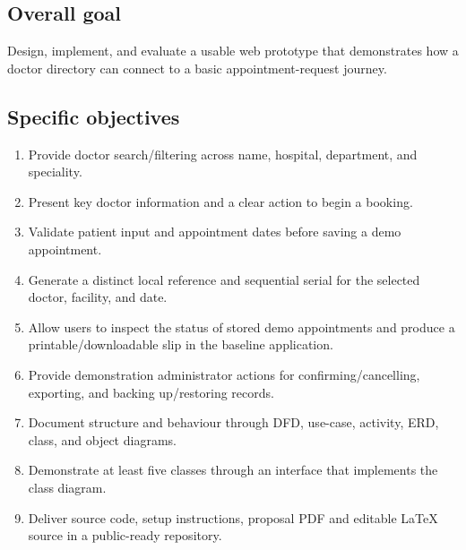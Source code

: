\documentclass[11pt,a4paper]{article}
\begin{document}
\subsection{Overall goal}
Design, implement, and evaluate a usable web prototype that demonstrates how a doctor directory can connect to a basic appointment-request journey.

\subsection{Specific objectives}
\begin{enumerate}
  \item Provide doctor search/filtering across name, hospital, department, and speciality.
  \item Present key doctor information and a clear action to begin a booking.
  \item Validate patient input and appointment dates before saving a demo appointment.
  \item Generate a distinct local reference and sequential serial for the selected doctor, facility, and date.
  \item Allow users to inspect the status of stored demo appointments and produce a printable/downloadable slip in the baseline application.
  \item Provide demonstration administrator actions for confirming/cancelling, exporting, and backing up/restoring records.
  \item Document structure and behaviour through DFD, use-case, activity, ERD, class, and object diagrams.
  \item Demonstrate at least five classes through an interface that implements the class diagram.
  \item Deliver source code, setup instructions, proposal PDF and editable LaTeX source in a public-ready repository.
\end{enumerate}
\end{document}
